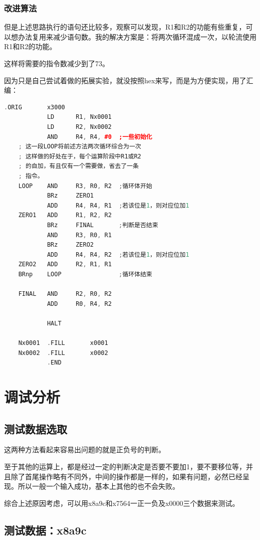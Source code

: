 \documentclass[UTF8]{article}
\begin{document}
	\subsubsection{改进算法}
	但是上述思路执行的语句还比较多，观察可以发现，R1和R2的功能有些重复，可以想办法复用来减少语句数。我的解决方案是：将两次循环混成一次，以轮流使用R1和R2的功能。\par
	这样将需要的指令数减少到了73。\par
	因为只是自己尝试着做的拓展实验，就没按照hex来写，而是为方便实现，用了汇编：\par
	\begin{lstlisting}[language=C++, name=直接赋值法改良(.asm)]
			.ORIG		x3000
			LD		R1, Nx0001
			LD		R2, Nx0002
			AND		R4, R4, #0	;一些初始化
	; 这一段LOOP将前述方法两次循环综合为一次
	; 这样做的好处在于，每个运算阶段中R1或R2
	; 的自加，有且仅有一个需要做，省去了一条
	; 指令。
	LOOP	AND		R3, R0, R2	;循环体开始
			BRz		ZERO1		
			ADD		R4, R4, R1	;若该位是1，则对应位加1
	ZERO1	ADD		R1, R2, R2
			BRz		FINAL		;判断是否结束
			AND		R3, R0, R1
			BRz		ZERO2
			ADD		R4, R4, R2	;若该位是1，则对应位加1
	ZERO2	ADD		R2, R1, R1
	BRnp	LOOP				;循环体结束
	
	FINAL	AND		R2, R0, R2
			ADD		R0, R4, R2
	
			HALT
	
	Nx0001	.FILL		x0001
	Nx0002	.FILL		x0002
			.END	
	\end{lstlisting}\par
	
	\section{调试分析}
	\subsection{测试数据选取}
	这两种方法看起来容易出问题的就是正负号的判断。\par
	至于其他的运算上，都是经过一定的判断决定是否要不要加1，要不要移位等，并且除了首尾操作略有不同外，中间的操作都是一样的，如果有问题，必然已经呈现。所以一般一个输入成功，基本上其他的也不会失败。\par
	综合上述原因考虑，可以用x8a9c和x7564一正一负及x0000三个数据来测试。\par
	
	\subsection{测试数据：x8a9c}
\end{document}

